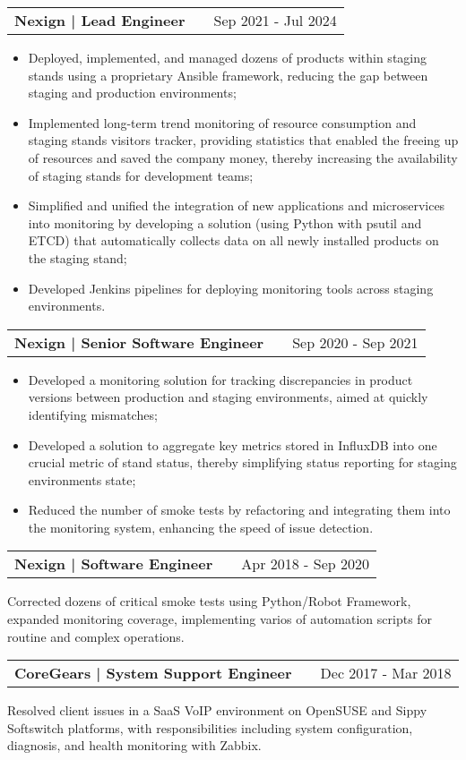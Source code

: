 \documentclass[a4paper,12pt]{article}
\makeatletter
\newenvironment{jobshort}[2]
    {
    \begin{tabularx}{\linewidth}{@{}l X r@{}}
    \textbf{#1} & \hfill &  #2 \\[3.75pt]
    \end{tabularx}
    }
    {
    }
\newenvironment{joblong}[2]
    {
    \begin{tabularx}{\linewidth}{@{}l X r@{}}
    \textbf{#1} & \hfill &  #2 \\[3.75pt]
    \end{tabularx}
    \begin{minipage}[t]{\linewidth}
    \begin{itemize}[nosep,after=\strut, leftmargin=1em, itemsep=3pt,label=--]
    }
    {
    \end{itemize}
    \end{minipage}    
    }
\makeatother
\begin{document}
\begin{joblong}{Nexign | Lead Engineer}{Sep 2021 - Jul 2024}
\item Deployed, implemented, and managed dozens of products within staging stands using a proprietary Ansible framework, reducing the gap between staging and production environments;
\item Implemented long-term trend monitoring of resource consumption and staging stands visitors tracker, providing statistics that enabled the freeing up of resources and saved the company money, thereby increasing the availability of staging stands for development teams;
\item Simplified and unified the integration of new applications and microservices into monitoring by developing a solution (using Python with psutil and ETCD) that automatically collects data on all newly installed products on the staging stand;
\item Developed Jenkins pipelines for deploying monitoring tools across staging environments.
\end{joblong}

\begin{joblong}{Nexign | Senior Software Engineer}{Sep 2020 - Sep 2021}
\item Developed a monitoring solution for tracking discrepancies in product versions between production and staging environments, aimed at quickly identifying mismatches;
\item Developed a solution to aggregate key metrics stored in InfluxDB into one crucial metric of stand status, thereby simplifying status reporting for staging environments state;
\item Reduced the number of smoke tests by refactoring and integrating them into the monitoring system, enhancing the speed of issue detection.
\end{joblong}

\begin{jobshort}{Nexign | Software Engineer}{Apr 2018 - Sep 2020}
Corrected dozens of critical smoke tests using Python/Robot Framework, expanded monitoring coverage, implementing varios of automation scripts for routine and complex operations.
\end{jobshort}

\begin{jobshort}{CoreGears | System Support Engineer}{Dec 2017 - Mar 2018}
Resolved client issues in a SaaS VoIP environment on OpenSUSE and Sippy Softswitch platforms, with responsibilities including system configuration, diagnosis, and health monitoring with Zabbix.
\end{jobshort}
\end{document}
